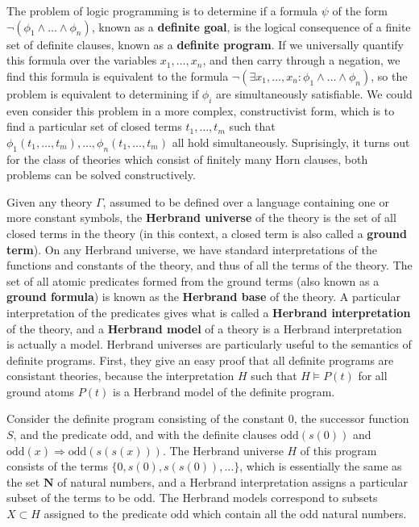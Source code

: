 The problem of logic programming is to determine if a formula $\psi$ of the form $\neg (\phi_1 \wedge \dots \wedge \phi_n)$, known as a {\bf definite goal}, is the logical consequence of a finite set of definite clauses, known as a {\bf definite program}. If we universally quantify this formula over the variables $x_1, \dots, x_n$, and then carry through a negation, we find this formula is equivalent to the formula $\neg (\exists x_1, \dots, x_n: \phi_1 \wedge \dots \wedge \phi_n)$, so the problem is equivalent to determining if $\phi_i$ are simultaneously satisfiable. We could even consider this problem in a more complex, constructivist form, which is to find a particular set of closed terms $t_1, \dots, t_m$ such that $\phi_1(t_1, \dots, t_m), \dots, \phi_n(t_1, \dots, t_m)$ all hold simultaneously. Suprisingly, it turns out for the class of theories which consist of finitely many Horn clauses, both problems can be solved constructively.

Given any theory $\Gamma$, assumed to be defined over a language containing one or more constant symbols, the {\bf Herbrand universe} of the theory is the set of all closed terms in the theory (in this context, a closed term is also called a {\bf ground term}). On any Herbrand universe, we have standard interpretations of the functions and constants of the theory, and thus of all the terms of the theory. The set of all atomic predicates formed from the ground terms (also known as a {\bf ground formula}) is known as the {\bf Herbrand base} of the theory. A particular interpretation of the predicates gives what is called a {\bf Herbrand interpretation} of the theory, and a {\bf Herbrand model} of a theory is a Herbrand interpretation is actually a model. Herbrand universes are particularly useful to the semantics of definite programs. First, they give an easy proof that all definite programs are consistant theories, because the interpretation $H$ such that $H \vDash P(t)$ for all ground atoms $P(t)$ is a Herbrand model of the definite program.

\begin{example}
    Consider the definite program consisting of the constant $0$, the successor function $S$, and the predicate $\text{odd}$, and with the definite clauses $\text{odd}(s(0))$ and $\text{odd}(x) \Rightarrow \text{odd}(s(s(x)))$. The Herbrand universe $H$ of this program consists of the terms $\{ 0, s(0), s(s(0)), \dots \}$, which is essentially the same as the set $\mathbf{N}$ of natural numbers, and a Herbrand interpretation assigns a particular subset of the terms to be odd. The Herbrand models correspond to subsets $X \subset H$ assigned to the predicate $\text{odd}$ which contain all the odd natural numbers.
\end{example}

